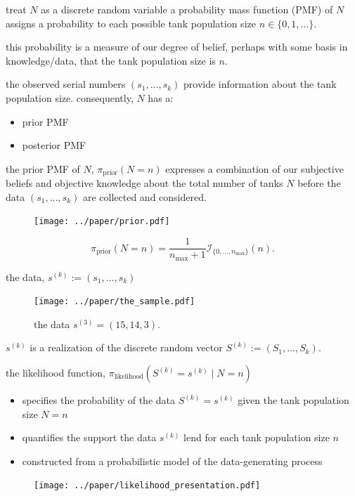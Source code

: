 \documentclass[10pt]{beamer}
\newcommand{\data}{$(s_1, ..., s_k)$\xspace}
\begin{document}
\begin{frame}[t]{treat $N$ as a discrete random variable}
a probability mass function (PMF) of $N$ assigns a probability to each possible tank population size $n\in\{0,1,...\}$. 

\pause 

 this probability is a measure of our degree of belief, perhaps with some basis in knowledge/data, that the tank population size is $n$. 

\pause 

the observed serial numbers \data provide information about the tank population size. consequently, $N$ has a:
\begin{itemize}
	\item prior PMF
	\item posterior PMF
\end{itemize}
\end{frame}


\begin{frame}[t]{the prior PMF of $N$, $\pi_{\text{prior}}(N=n)$}
expresses a combination of our subjective beliefs and objective knowledge about the total number of tanks $N$ before the data \data are collected and considered. 

\begin{figure}[h!]
	\centering
	\texttt{[image: ../paper/prior.pdf]}
\end{figure}

\begin{equation*}
	\pi_{\text{prior}}(N=n) = \dfrac{1}{n_{\max}+1} \mathcal{I}_{ \{0, ..., n_{\text{max}}\}}(n).	 
\end{equation*}
\end{frame}

\begin{frame}[t]{the data, $s^{(k)}:=(s_1,...,s_k)$}
\begin{figure}
	\centering
	\texttt{[image: ../paper/the\_sample.pdf]}
	\caption{the data $s^{(3)}=(15, 14, 3)$.}
\end{figure}

 $s^{(k)}$ is a realization of the discrete random vector $S^{(k)}:=(S_1, ..., S_k)$. 
\end{frame}


\begin{frame}[t]{the likelihood function, $\pi_{\text{likelihood}}(S^{(k)}=s^{(k)} \mid N=n)$}
\begin{itemize}
	\item specifies the probability of the data $S^{(k)}=s^{(k)}$ given the tank population size $N=n$
	\item quantifies the support the data $s^{(k)}$ lend for each tank population size $n$
	\item constructed from a probabilistic model of the data-generating process
\end{itemize}

\begin{figure}[h!]
	\centering
	\texttt{[image: ../paper/likelihood\_presentation.pdf]}
\end{figure}
\end{frame}
\end{document}
